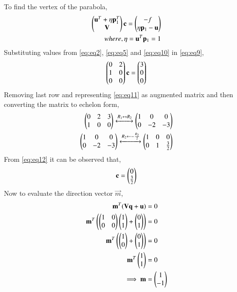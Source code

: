 \documentclass[journal,12pt,twocolumn]{IEEEtran}
\begin{document}
To find the vertex of the parabola,
\begin{align}
    \begin{pmatrix}\mathbf{u}^T+\eta \mathbf{p}_1^T \\ \mathbf{V}\end{pmatrix}\mathbf{c} = \begin{pmatrix}-f \\ \eta \mathbf{p}_1-\mathbf{u}\end{pmatrix} \label{eq:eq9} \\
    where, \eta = \mathbf{u}^T\mathbf{p}_1 = 1 \label{eq:eq10}
\end{align}
Substituting values from \eqref{eq:eq2}, \eqref{eq:eq5} and \eqref{eq:eq10} in \eqref{eq:eq9}, 
\begin{align}
    \begin{pmatrix}0 & 2 \\ 1 & 0 \\ 0 & 0\end{pmatrix}\mathbf{c}=\begin{pmatrix}3 \\ 0 \\ 0\end{pmatrix} \label{eq:eq11}
\end{align}
Removing last row and representing \eqref{eq:eq11} as augmented matrix and then converting the matrix to echelon form,
\begin{align}
    \begin{pmatrix}0 & 2 & 3 \\ 1 & 0 & 0\end{pmatrix} \xleftrightarrow[]{R_1\leftrightarrow R_2} \begin{pmatrix}1 & 0 & 0 \\ 0 & -2 & -3\end{pmatrix}\\
    \begin{pmatrix}1 & 0 & 0 \\ 0 & -2 & -3\end{pmatrix} \xleftrightarrow[]{R_2\leftarrow -\frac{R_2}{2}} \begin{pmatrix}1 & 0 & 0 \\ 0 & 1 & \frac{3}{2}\end{pmatrix}\label{eq:eq12}
\end{align}
From \eqref{eq:eq12} it can be observed that,
\begin{align}
    \mathbf{c} = \begin{pmatrix}0 \\ \frac{3}{2}\end{pmatrix} \label{eq:eq13}
\end{align}
Now to evaluate the direction vector $\vec{m}$,
\begin{align}
    \mathbf{m}^T(\mathbf{V}\mathbf{q} + \mathbf{u}) &= 0 \\
    \mathbf{m}^T\begin{pmatrix}\begin{pmatrix}1 & 0 \\ 0 & 0\end{pmatrix}\begin{pmatrix}1 \\ 1\end{pmatrix} +\begin{pmatrix}0 \\ 1\end{pmatrix}\end{pmatrix} &= 0 \\
    \mathbf{m}^T\begin{pmatrix}\begin{pmatrix}1 \\ 0\end{pmatrix} +\begin{pmatrix}0 \\ 1\end{pmatrix}\end{pmatrix} &= 0 \\
    \mathbf{m}^T\begin{pmatrix}1 \\ 1\end{pmatrix} &= 0 \\
    \implies \mathbf{m} &= \begin{pmatrix}1 \\ -1\end{pmatrix} \label{eq:eq14}
\end{align}
\end{document}

